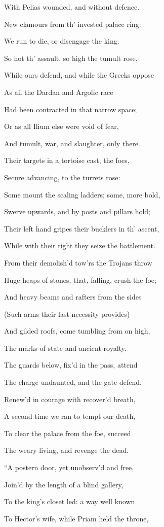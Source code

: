 With Pelias wounded, and without defence.

New clamours from th’ invested palace ring:

We run to die, or disengage the king.

So hot th’ assault, so high the tumult rose,

While ours defend, and while the Greeks oppose

As all the Dardan and Argolic race

Had been contracted in that narrow space;

Or as all Ilium else were void of fear,

And tumult, war, and slaughter, only there.

Their targets in a tortoise cast, the foes,

Secure advancing, to the turrets rose:

Some mount the scaling ladders; some, more bold,

Swerve upwards, and by posts and pillars hold;

Their left hand gripes their bucklers in th’ ascent,

While with their right they seize the battlement.

From their demolish’d tow’rs the Trojans throw

Huge heaps of stones, that, falling, crush the foe;

And heavy beams and rafters from the sides

(Such arms their last necessity provides)

And gilded roofs, come tumbling from on high,

The marks of state and ancient royalty.

The guards below, fix’d in the pass, attend

The charge undaunted, and the gate defend.

Renew’d in courage with recover’d breath,

A second time we ran to tempt our death,

To clear the palace from the foe, succeed

The weary living, and revenge the dead.

“A postern door, yet unobserv’d and free,

Join’d by the length of a blind gallery,

To the king’s closet led: a way well known

To Hector’s wife, while Priam held the throne,

